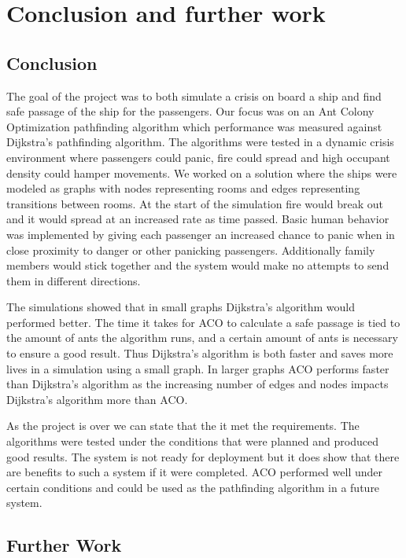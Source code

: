 \chapter{Conclusion and further work}
\label{ch:conclusion}

\section{Conclusion}

The goal of the project was to both simulate a crisis on board a ship and find safe passage of the ship for the passengers. Our focus was on an Ant Colony Optimization pathfinding algorithm which performance was measured against Dijkstra's pathfinding algorithm.  The algorithms were tested in a dynamic crisis environment where passengers could panic, fire could spread and high occupant density could hamper movements. We worked on a solution where the ships were modeled as graphs with nodes representing rooms and edges representing transitions between rooms. At the start of the simulation fire would break out and it would spread at an increased rate as time passed. Basic human behavior was implemented by giving each passenger an increased chance to panic when in close proximity to danger or other panicking passengers. Additionally family members would stick together and the system would make no attempts to send them in different directions. 

The simulations showed that in small graphs Dijkstra's algorithm would performed better. The time it takes for ACO to calculate a safe passage is tied to the amount of ants the algorithm runs, and a certain amount of ants is necessary to ensure a good result. Thus Dijkstra's algorithm is both faster and saves more lives in a simulation using a small graph. In larger graphs ACO performs faster than Dijkstra's algorithm as the increasing number of edges and nodes impacts Dijkstra's algorithm more than ACO.

As the project is over we can state that the it met the requirements. The algorithms were tested under the conditions that were planned and produced good results. The system is not ready for deployment but it does show that there are benefits to such a system if it were completed. ACO performed well under certain conditions and could be used as the pathfinding algorithm in a future system.

\section{Further Work}

